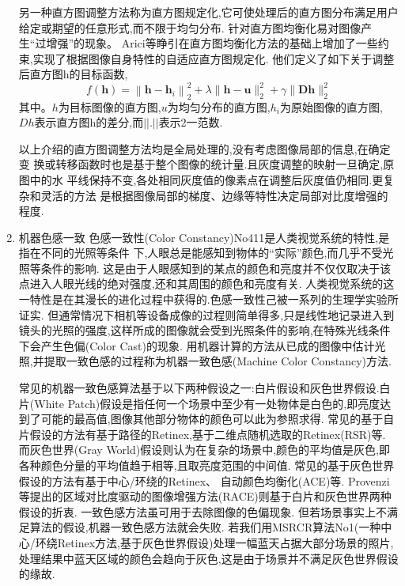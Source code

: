 \documentclass{amsart}
\begin{document}
\begin{enumerate}
  另一种直方图调整方法称为直方图规定化,它可使处理后的直方图分布满足用户给定或期望的任意形式,而不限于均匀分布.
  针对直方图均衡化易对图像产生“过增强”的现象。
  Arici等睁引在直方图均衡化方法的基础上增加了一些约束,实现了根据图像自身特性的自适应直方图规定化.
  他们定义了如下关于调整后直方图h的目标函数,
  \begin{equation}
    \label{eq:13}
    f(\boldsymbol{h})=\left\|\boldsymbol{h}-\boldsymbol{h}_{i}\right\|_{2}^{2}+\lambda\|\boldsymbol{h}-\boldsymbol{u}\|_{2}^{2}+\gamma\|\boldsymbol{D} \boldsymbol{h}\|_{2}^{2}
  \end{equation}
  其中。$h$为目标图像的直方图,$u$为均匀分布的直方图,$h_i$为原始图像的直方图,
  $Dh$表示直方图h的差分,而$||.||$表示2一范数.


以上介绍的直方图调整方法均是全局处理的,没有考虑图像局部的信息,在确定变
换或转移函数时也是基于整个图像的统计量.且灰度调整的映射一旦确定,原图中的水
平线保持不变,各处相同灰度值的像素点在调整后灰度值仍相同.更复杂和灵活的方法
是根据图像局部的梯度、边缘等特性决定局部对比度增强的程度.


\item 机器色感一致
色感一致性(Color Constancy)No411是人类视觉系统的特性,是指在不同的光照等条件
下,人眼总是能感知到物体的“实际”颜色,而几乎不受光照等条件的影响.
这是由于人眼感知到的某点的颜色和亮度并不仅仅取决于该点进入人眼光线的绝对强度,还和其周围的颜色和亮度有关.
人类视觉系统的这一特性是在其漫长的进化过程中获得的.色感一致性己被一系列的生理学实验所证实.
但通常情况下相机等设备成像的过程则简单得多,只是线性地记录进入到镜头的光照的强度,这样所成的图像就会受到光照条件的影响,在特殊光线条件下会产生色偏(Color Cast)的现象.
用机器计算的方法从已成的图像中估计光照,并提取一致色感的过程称为机器一致色感(Machine Color Constancy)方法.

常见的机器一致色感算法基于以下两种假设之一:白片假设和灰色世界假设.白片(White Patch)假设是指任何一个场景中至少有一处物体是白色的,即亮度达到了可能的最高值,图像其他部分物体的颜色可以此为参照求得.
常见的基于自片假设的方法有基于路径的Retinex,基于二维点随机选取的Retinex(RSR)等.
而灰色世界(Gray World)假设则认为在复杂的场景中,颜色的平均值是灰色,即各种颜色分量的平均值趋于相等,且取亮度范围的中间值.
常见的基于灰色世界假设的方法有基于中心/环绕的Retinex、
自动颜色均衡化(ACE)等.
Provenzi等提出的区域对比度驱动的图像增强方法(RACE)则基于白片和灰色世界两种假设的折衷.
一致色感方法虽可用于去除图像的色偏现象.
但若场景事实上不满足算法的假设,机器一致色感方法就会失败.
若我们用MSRCR算法No1(一种中心/环绕Retinex方法,基于灰色世界假设)处理一幅蓝天占据大部分场景的照片,处理结果中蓝天区域的颜色会趋向于灰色,这是由于场景并不满足灰色世界假设的缘故.
\end{enumerate}
\end{document}
